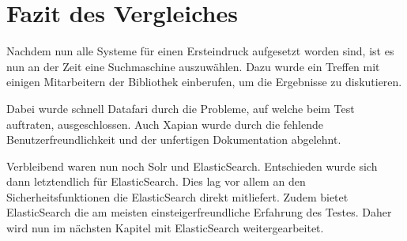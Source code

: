 
\chapter{Fazit des Vergleiches}

Nachdem nun alle Systeme für einen Ersteindruck aufgesetzt worden sind, ist es nun an der Zeit eine Suchmaschine auszuwählen. Dazu wurde ein Treffen mit einigen Mitarbeitern der Bibliothek einberufen, um die Ergebnisse zu diskutieren. 

Dabei wurde schnell Datafari durch die Probleme, auf welche beim Test auftraten, ausgeschlossen. Auch Xapian wurde durch die fehlende Benutzerfreundlichkeit und der unfertigen Dokumentation abgelehnt. 


Verbleibend waren nun noch Solr und ElasticSearch. Entschieden wurde sich dann letztendlich für ElasticSearch. Dies lag vor allem an den Sicherheitsfunktionen die ElasticSearch direkt mitliefert. Zudem bietet ElasticSearch die am meisten einsteigerfreundliche Erfahrung des Testes. Daher wird nun im nächsten Kapitel mit ElasticSearch weitergearbeitet.